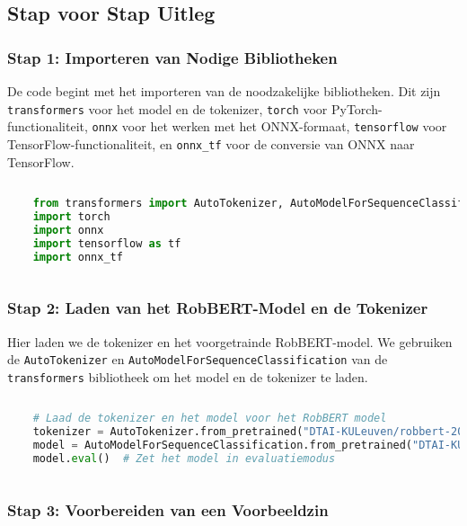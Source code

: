 \subsection{Stap voor Stap Uitleg}

\subsubsection{Stap 1: Importeren van Nodige Bibliotheken}

De code begint met het importeren van de noodzakelijke bibliotheken. Dit zijn \texttt{transformers} voor het model en de tokenizer, \texttt{torch} voor PyTorch-functionaliteit, \texttt{onnx} voor het werken met het ONNX-formaat, \texttt{tensorflow} voor TensorFlow-functionaliteit, en \texttt{onnx\_tf} voor de conversie van ONNX naar TensorFlow.

\begin{lstlisting}[language=Python, caption={Importeren van benodigde bibliotheken.}]
    
    from transformers import AutoTokenizer, AutoModelForSequenceClassification
    import torch
    import onnx
    import tensorflow as tf
    import onnx_tf
    
\end{lstlisting}

\subsubsection{Stap 2: Laden van het RobBERT-Model en de Tokenizer}

Hier laden we de tokenizer en het voorgetrainde RobBERT-model. We gebruiken de \texttt{AutoTokenizer} en \texttt{AutoModelForSequenceClassification} van de \texttt{transformers} bibliotheek om het model en de tokenizer te laden.

\begin{lstlisting}[language=Python, caption={Laden van de tokenizer en het RobBERT-model.}]
    
    # Laad de tokenizer en het model voor het RobBERT model
    tokenizer = AutoTokenizer.from_pretrained("DTAI-KULeuven/robbert-2023-dutch-large")
    model = AutoModelForSequenceClassification.from_pretrained("DTAI-KULeuven/robbert-2023-dutch-large")
    model.eval()  # Zet het model in evaluatiemodus
    
\end{lstlisting}

\subsubsection{Stap 3: Voorbereiden van een Voorbeeldzin}

